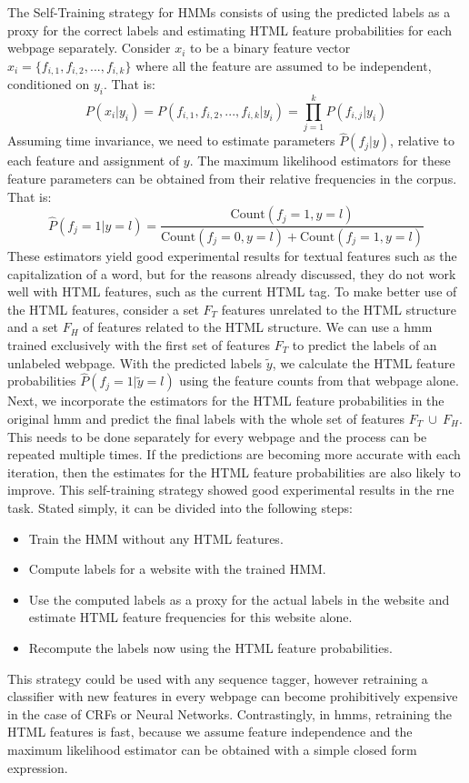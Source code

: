 \documentclass{nle}
\begin{document}
The Self-Training strategy for HMMs consists of using the predicted labels as a proxy for the
correct labels and estimating HTML feature probabilities for each webpage separately.
Consider $ x_i $ to be a binary feature vector $ x_i = \{ f_{i,1}, f_{i,2}, ..., f_{i,k} \} $
where all the feature are assumed to be independent, conditioned on $ y_i $. That is:
\begin{equation}
P(x_i|y_i) = P(f_{i,1}, f_{i,2}, ..., f_{i,k}|y_i) = \prod_{j=1}^k P(f_{i,j}|y_i)
\end{equation}
%
Assuming time invariance, we need to estimate parameters $ \hat{P}(f_{j}|y) $, 
relative to each feature and assignment of $ y $.
The maximum likelihood estimators for these feature parameters can be obtained
from their relative frequencies in the corpus. That is:
%
\begin{equation}
\hat{P}(f_{j}=1|y=l) = \frac{\text{Count}(f_{j}=1, y=l)}
{\text{Count}(f_{j}=0, y=l) + \text{Count}(f_{j}=1, y=l)}
\label{eq:feature_mle}
\end{equation}
%
These estimators yield good experimental results for textual features such as the 
capitalization of a word, but for the reasons already discussed, they do not work
well with HTML features, such as the current HTML tag. To make better use of the
HTML features, consider a set $ F_T $ features unrelated to the HTML structure
and a set $ F_H $ of features related to the HTML structure.
We can use a \gls{hmm} trained exclusively with the first set of features $ F_T $
to predict the labels of an unlabeled webpage. With the predicted labels $ \tilde{y} $, we calculate
the HTML feature probabilities $ \hat{P}(f_{j}=1|\tilde{y}=l) $ using the feature counts from
that webpage alone. Next, we incorporate the estimators for the HTML feature probabilities 
in the original \gls{hmm} and predict the final labels with the whole set of features 
{$ F_T~\cup~F_H $}. This needs to be done separately for every webpage and
the process can be repeated multiple times. If the predictions are becoming more accurate with
each iteration, then the estimates for the HTML feature probabilities are also likely to improve. 
This self-training strategy showed good experimental results in the \gls{rne} task. Stated
simply, it can be divided into the following steps:
%
\begin{itemize}
\item Train the HMM without any HTML features.
\item Compute labels for a website with the trained HMM.
\item Use the computed labels as a proxy for the actual labels in the 
website and estimate HTML feature frequencies for this website alone.
\item Recompute the labels now using the HTML feature probabilities.
\end{itemize}
%
This strategy could be used with any sequence tagger, however retraining a classifier 
with new features in every webpage can become prohibitively expensive in the case of 
CRFs or Neural Networks. Contrastingly, in \gls{hmm}s, retraining the HTML features is fast, 
because we assume feature independence and the maximum likelihood estimator can be obtained 
with a simple closed form expression.
\end{document}
